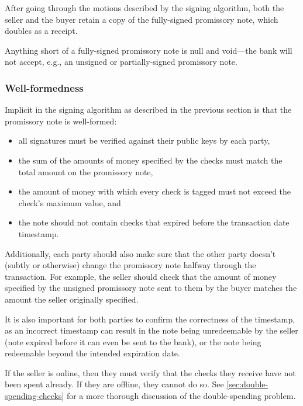 \documentclass[12pt,a4paper]{article}
\begin{document}
	\newpage
	\begin{multicols}{2}

	After going through the motions described by the signing algorithm, both the seller and the buyer retain a copy of the fully-signed promissory note, which doubles as a receipt.
	
	Anything short of a fully-signed promissory note is null and void---the bank will not accept, e.g., an unsigned or partially-signed promissory note.
	
	\subsubsection{Well-formedness}

	Implicit in the signing algorithm as described in the previous section is that the promissory note is well-formed:
	
	\begin{itemize}
		\item all signatures must be verified against their public keys by each party,
		\item the sum of the amounts of money specified by the checks must match the total amount on the promissory note,
		\item the amount of money with which every check is tagged must not exceed the check's maximum value, and
		\item the note should not contain checks that expired before the transaction date timestamp.
	\end{itemize}

	Additionally, each party should also make sure that the other party doesn't (subtly or otherwise) change the promissory note halfway through the transaction. For example, the seller should check that the amount of money specified by the unsigned promissory note sent to them by the buyer matches the amount the seller originally specified.
	
	It is also important for both parties to confirm the correctness of the timestamp, as an incorrect timestamp can result in the note being unredeemable by the seller (note expired before it can even be sent to the bank), or the note being redeemable beyond the intended expiration date.
	
	If the seller is online, then they must verify that the checks they receive have not been spent already. If they are offline, they cannot do so. See \autoref{sec:double-spending-checks} for a more thorough discussion of the double-spending problem.


\end{multicols}
\end{document}
